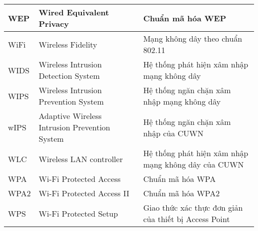 \begin{table}[H]
\begin{tabular}{|l|p{6cm}|p{7cm}|}
WEP                               & Wired Equivalent Privacy                                                & Chuẩn mã hóa WEP                                             \\ \hline
WiFi                              & Wireless Fidelity                                                       & Mạng không dây theo chuẩn 802.11                             \\ \hline
WIDS                              & Wireless Intrusion Detection System                                     & Hệ thống phát hiện xâm nhập mạng không dây                   \\ \hline
WIPS                              & Wireless Intrusion Prevention System                                    & Hệ thống ngăn chặn xâm nhập mạng không dây                   \\ \hline
wIPS                              & Adaptive Wireless Intrusion Prevention System                           & Hệ thống ngăn chặn xâm nhập của CUWN                         \\ \hline
WLC                               & Wireless LAN controller                                                 & Hệ thống phát hiện xâm nhập mạng không dây của CUWN          \\ \hline
WPA                               & Wi-Fi Protected Access                                                  & Chuẩn mã hóa WPA                                             \\ \hline
WPA2                              & Wi-Fi Protected Access II                                               & Chuẩn mã hóa WPA2                                            \\ \hline
WPS                               & Wi-Fi Protected Setup                                                   & Giao thức xác thực đơn giản của thiết bị Access Point        \\ \hline
\end{tabular}
\end{table}

  